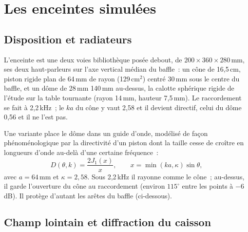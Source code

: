 \documentclass[11pt,a4paper]{article}
\begin{document}
\section{Les enceintes simulées}
\label{sec:loudspeaker}

\subsection{Disposition et radiateurs}

L'enceinte est une deux voies bibliothèque posée debout, de $200 \times 360 \times 280$\,mm, ses deux
haut-parleurs sur l'axe vertical médian du baffle~: un cône de 16,5\,cm, piston rigide plan de 64\,mm de
rayon (129\,cm$^2$) centré 30\,mm sous le centre du baffle, et un dôme de 28\,mm 140\,mm au-dessus, la
calotte sphérique rigide de l'étude sur la table tournante \cite{turntable2026} (rayon 14\,mm, hauteur
7,5\,mm). Le raccordement se fait à 2,2\,kHz~; le $ka$ du cône y vaut 2,58 et il devient directif, celui
du dôme 0,56 et il ne l'est pas.

Une variante place le dôme dans un guide d'onde, modélisé de façon phénoménologique par la directivité
d'un piston dont la taille cesse de croître en longueurs d'onde au-delà d'une certaine fréquence~:
\begin{equation}
D(\theta, k) = \frac{2 J_1(x)}{x}, \qquad x = \min(k a, \kappa) \sin\theta,
\end{equation}
avec $a = 64$\,mm et $\kappa = 2,58$. Sous 2,2\,kHz il rayonne comme le cône~; au-dessus, il garde
l'ouverture du cône au raccordement (environ $115^\circ$ entre les points à $-6$\,dB). Il protège d'autant
les arêtes du baffle (ci-dessous).

\subsection{Champ lointain et diffraction du caisson}
\end{document}
